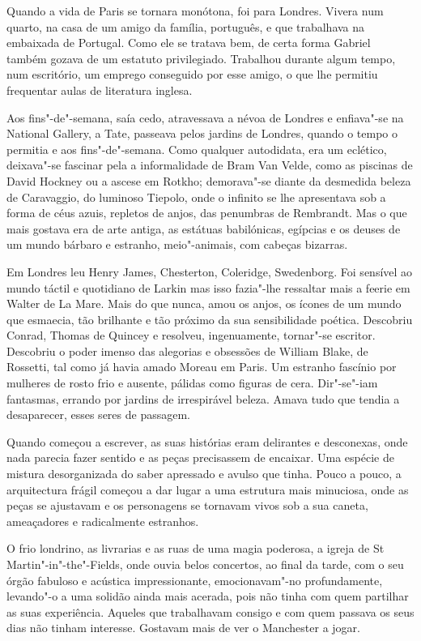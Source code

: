 Quando a vida de Paris se tornara monótona, foi para Londres. Vivera num
quarto, na casa de um amigo da família, português, e que trabalhava na
embaixada de Portugal. Como ele se tratava bem, de certa forma Gabriel
também gozava de um estatuto privilegiado. Trabalhou durante algum
tempo, num escritório, um emprego conseguido por esse amigo, o que lhe
permitiu frequentar aulas de literatura inglesa.

Aos fins"-de"-semana, saía cedo, atravessava a névoa de Londres e
enfiava"-se na National Gallery, a Tate, passeava pelos jardins de
Londres, quando o tempo o permitia e aos fins"-de"-semana. Como qualquer
autodidata, era um eclético, deixava"-se fascinar pela a informalidade
de Bram Van Velde, como as piscinas de David Hockney ou a ascese em
Rotkho; demorava"-se diante da desmedida beleza de Caravaggio, do
luminoso Tiepolo, onde o infinito se lhe apresentava sob a forma de céus
azuis, repletos de anjos, das penumbras de Rembrandt. Mas o que mais
gostava era de arte antiga, as estátuas babilónicas, egípcias e os
deuses de um mundo bárbaro e estranho, meio"-animais, com cabeças
bizarras.

Em Londres leu Henry James, Chesterton, Coleridge, Swedenborg. Foi
sensível ao mundo táctil e quotidiano de Larkin mas isso fazia"-lhe
ressaltar mais a feerie em Walter de La Mare. Mais do que nunca, amou os
anjos, os ícones de um mundo que esmaecia, tão brilhante e tão próximo
da sua sensibilidade poética. Descobriu Conrad, Thomas de Quincey e
resolveu, ingenuamente, tornar"-se escritor. Descobriu o poder imenso das
alegorias e obsessões de William Blake, de Rossetti, tal como já havia
amado Moreau em Paris. Um estranho fascínio por mulheres de rosto frio e
ausente, pálidas como figuras de cera. Dir"-se"-iam fantasmas, errando por
jardins de irrespirável beleza. Amava tudo que tendia a desaparecer,
esses seres de passagem.

Quando começou a escrever, as suas histórias eram delirantes e
desconexas, onde nada parecia fazer sentido e as peças precisassem de
encaixar. Uma espécie de mistura desorganizada do saber apressado e
avulso que tinha. Pouco a pouco, a arquitectura frágil começou a dar
lugar a uma estrutura mais minuciosa, onde as peças se ajustavam e os
personagens se tornavam vivos sob a sua caneta, ameaçadores e
radicalmente estranhos.

O frio londrino, as livrarias e as ruas de uma magia poderosa, a igreja
de St Martin"-in"-the"-Fields, onde ouvia belos concertos, ao final da
tarde, com o seu órgão fabuloso e acústica impressionante,
emocionavam"-no profundamente, levando"-o a uma solidão ainda mais
acerada, pois não tinha com quem partilhar as suas experiência. Aqueles
que trabalhavam consigo e com quem passava os seus dias não tinham
interesse. Gostavam mais de ver o Manchester a jogar.

